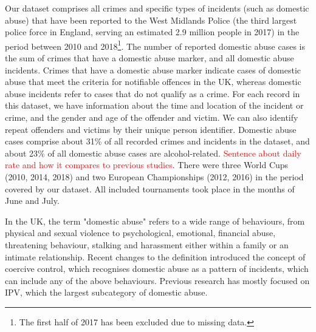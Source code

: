 \documentclass[12pt, letterpaper]{article}
\begin{document}
Our dataset comprises all crimes and specific types of incidents (such as domestic abuse) that have been reported to the West Midlands Police (the third largest police force in England\autocite{Homeoffice}, serving an estimated 2.9 million people in 2017\autocite{populationfigure}) in the period between 2010 and 2018\footnote{The first half of 2017 has been excluded due to missing data.}. The number of reported domestic abuse cases is the sum of crimes that have a domestic abuse marker, and all domestic abuse incidents. Crimes that have a domestic abuse marker indicate cases of domestic abuse that meet the criteria for notifiable offences in the UK, whereas domestic abuse incidents refer to cases that do not qualify as a crime. For each record in this dataset, we have information about the time and location of the incident or crime, and the gender and age of the offender and victim. We can also identify repeat offenders and victims by their unique person identifier. Domestic abuse cases comprise about 31\% of all recorded crimes and incidents in the dataset, and about 23\% of all domestic abuse cases are alcohol-related. \textcolor{red}{Sentence about daily rate and how it compares to previous studies}. There were three World Cups (2010, 2014, 2018) and two European Championships (2012, 2016) in the period covered by our dataset. All included tournaments took place in the months of June and July.

In the UK, the term "domestic abuse" refers to a wide range of behaviours, from physical and sexual violence to psychological, emotional, financial abuse, threatening behaviour, stalking and harassment either within a family or an intimate relationship\autocite{ONS}. Recent changes to the definition introduced the concept of coercive control, which recognises domestic abuse as a pattern of incidents, which can include any of the above behaviours. Previous research has mostly focused on IPV, which the largest subcategory of domestic abuse. 
\end{document}
